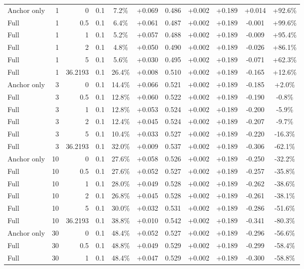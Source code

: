 \begin{table}[htbp]
\begin{tabular}{lrrrccccccc}
Anchor only & 1 & 0 & 0.1 & 7.2\% & +0.069 & 0.486 & +0.002 & +0.189 & +0.014 & +92.6\% \\
Full & 1 & 0.5 & 0.1 & 6.4\% & +0.061 & 0.487 & +0.002 & +0.189 & -0.001 & +99.6\% \\
Full & 1 & 1 & 0.1 & 5.2\% & +0.057 & 0.488 & +0.002 & +0.189 & -0.009 & +95.4\% \\
Full & 1 & 2 & 0.1 & 4.8\% & +0.050 & 0.490 & +0.002 & +0.189 & -0.026 & +86.1\% \\
Full & 1 & 5 & 0.1 & 5.6\% & +0.030 & 0.495 & +0.002 & +0.189 & -0.071 & +62.3\% \\
Full & 1 & 36.2193 & 0.1 & 26.4\% & +0.008 & 0.510 & +0.002 & +0.189 & -0.165 & +12.6\% \\
Anchor only & 3 & 0 & 0.1 & 14.4\% & +0.066 & 0.521 & +0.002 & +0.189 & -0.185 & +2.0\% \\
Full & 3 & 0.5 & 0.1 & 12.8\% & +0.060 & 0.522 & +0.002 & +0.189 & -0.190 & -0.8\% \\
Full & 3 & 1 & 0.1 & 12.8\% & +0.053 & 0.524 & +0.002 & +0.189 & -0.200 & -5.9\% \\
Full & 3 & 2 & 0.1 & 12.4\% & +0.045 & 0.524 & +0.002 & +0.189 & -0.207 & -9.7\% \\
Full & 3 & 5 & 0.1 & 10.4\% & +0.033 & 0.527 & +0.002 & +0.189 & -0.220 & -16.3\% \\
Full & 3 & 36.2193 & 0.1 & 32.0\% & +0.009 & 0.537 & +0.002 & +0.189 & -0.306 & -62.1\% \\
Anchor only & 10 & 0 & 0.1 & 27.6\% & +0.058 & 0.526 & +0.002 & +0.189 & -0.250 & -32.2\% \\
Full & 10 & 0.5 & 0.1 & 27.6\% & +0.052 & 0.527 & +0.002 & +0.189 & -0.257 & -35.8\% \\
Full & 10 & 1 & 0.1 & 28.0\% & +0.049 & 0.528 & +0.002 & +0.189 & -0.262 & -38.6\% \\
Full & 10 & 2 & 0.1 & 26.8\% & +0.045 & 0.528 & +0.002 & +0.189 & -0.261 & -38.1\% \\
Full & 10 & 5 & 0.1 & 30.0\% & +0.032 & 0.531 & +0.002 & +0.189 & -0.286 & -51.6\% \\
Full & 10 & 36.2193 & 0.1 & 38.8\% & +0.010 & 0.542 & +0.002 & +0.189 & -0.341 & -80.3\% \\
Anchor only & 30 & 0 & 0.1 & 48.4\% & +0.052 & 0.527 & +0.002 & +0.189 & -0.296 & -56.6\% \\
Full & 30 & 0.5 & 0.1 & 48.8\% & +0.049 & 0.529 & +0.002 & +0.189 & -0.299 & -58.4\% \\
Full & 30 & 1 & 0.1 & 48.4\% & +0.047 & 0.529 & +0.002 & +0.189 & -0.300 & -58.8\% \\

\end{tabular}
\end{table}
